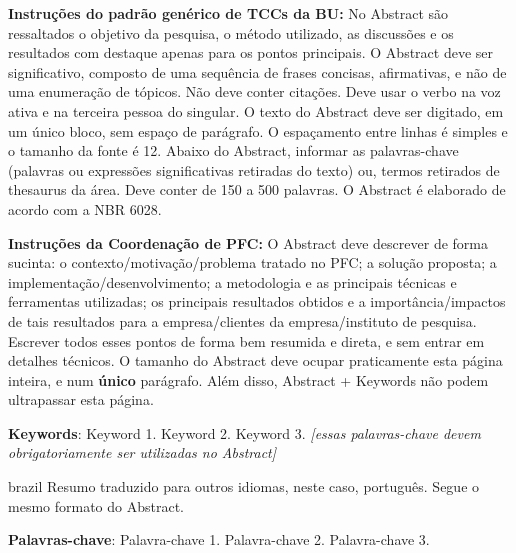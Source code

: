 \setlength{\absparsep}{18pt} %
\begin{resumo}
	\SingleSpacing
	\textbf{Instruções do padrão genérico de TCCs da BU:}
	No Abstract são ressaltados o objetivo da pesquisa, o método utilizado, as discussões e os resultados com destaque apenas para os pontos principais. O Abstract deve ser significativo, composto de uma sequência de frases concisas, afirmativas, e não de uma enumeração de tópicos. Não deve conter citações. Deve usar o verbo na voz ativa e na terceira pessoa do singular. O texto do Abstract deve ser digitado, em um único bloco, sem espaço de parágrafo. O espaçamento entre linhas é simples e o tamanho da fonte é 12. Abaixo do Abstract, informar as palavras-chave (palavras ou expressões significativas retiradas do texto) ou, termos retirados de thesaurus da área. Deve conter de 150 a 500 palavras. O Abstract é elaborado de acordo com a NBR 6028. 
	
	\textbf{Instruções da Coordenação de PFC:} O Abstract deve descrever de forma sucinta: o contexto/motivação/problema tratado no PFC; a solução proposta; a implementação/desenvolvimento; a metodologia e as principais técnicas e ferramentas utilizadas; os principais resultados obtidos e a importância/impactos de tais resultados para a empresa/clientes da empresa/instituto de pesquisa. Escrever todos esses pontos de forma bem resumida e direta, e sem entrar em detalhes técnicos. O tamanho do Abstract deve ocupar praticamente esta página inteira, e num \textbf{único} parágrafo. Além disso, Abstract + Keywords não podem ultrapassar esta página. 
	
	\textbf{Keywords}: Keyword 1. Keyword 2. Keyword 3. \emph{[essas palavras-chave devem obrigatoriamente ser utilizadas no Abstract]}
\end{resumo}

\begin{resumo}[Resumo]
	\SingleSpacing
	\begin{otherlanguage*}{brazil}
		Resumo traduzido para outros idiomas, neste caso, português. Segue o mesmo formato do Abstract.
		
		\textbf{Palavras-chave}: Palavra-chave 1. Palavra-chave 2. Palavra-chave 3.
	\end{otherlanguage*}
\end{resumo}

% 
%
%  

